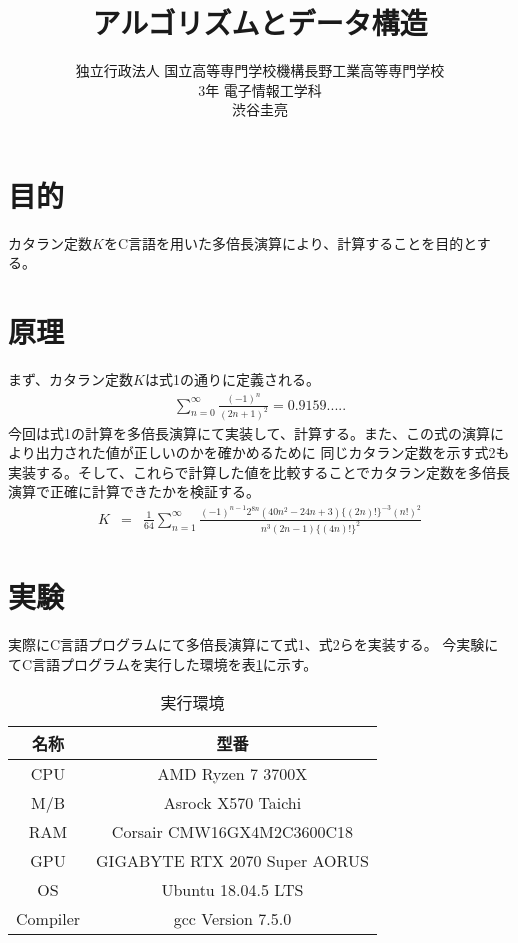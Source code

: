 \documentclass[a4j,dvipdfmx,titlepage]{jarticle}
\title{アルゴリズムとデータ構造}
\author{独立行政法人 国立高等専門学校機構長野工業高等専門学校
\\
3年 電子情報工学科
\\
渋谷圭亮
\\
}
\begin{document}
\maketitle
\section{目的}
カタラン定数$K$をC言語を用いた多倍長演算により、計算することを目的とする。
\section{原理}
まず、カタラン定数$K$は式1の通りに定義される。
\begin{eqnarray}
    \sum^{\infty}_{n=0}\frac{(-1)^{n}}{(2n+1)^2}=0.9159.....
\end{eqnarray}
今回は式1の計算を多倍長演算にて実装して、計算する。また、この式の演算により出力された値が正しいのかを確かめるために
同じカタラン定数を示す式2も実装する。そして、これらで計算した値を比較することでカタラン定数を多倍長演算で正確に計算できたかを検証する。
\begin{eqnarray}
    K&=&\frac{1}{64}\sum^{\infty}_{n=1}\frac{(-1)^{n-1}2^{8n}(40n^2-24n+3)\{(2n)!\}^{-3}(n!)^2}{n^3(2n-1)\{(4n)!\}^2}
\end{eqnarray}
\section{実験}
実際にC言語プログラムにて多倍長演算にて式1、式2らを実装する。
今実験にてC言語プログラムを実行した環境を表\ref{a}に示す。
\begin{table}[htb]
    \begin{center}
      \caption{実行環境}
      \begin{tabular}{c|c} 
       名称 & 型番 \\ \hline 
        CPU & AMD Ryzen 7 3700X\\
         M/B & Asrock X570 Taichi \\
         RAM &  Corsair CMW16GX4M2C3600C18\\
         GPU & GIGABYTE RTX 2070 Super AORUS\\
        OS & Ubuntu 18.04.5 LTS\\ 
        Compiler & gcc Version 7.5.0\\ 
      \end{tabular}
      \label{a}
\end{center}
\end{table}
\end{document}
